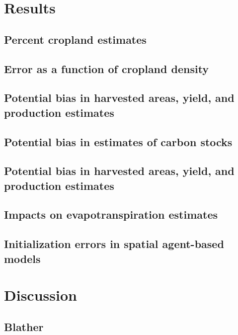 \documentclass{pnastwo}
\begin{document}
\begin{article}
\section{Results}

\subsection{Percent cropland estimates}

\subsection{Error as a function of cropland density}

\subsection{Potential bias in harvested areas, yield, and production estimates}

\subsection{Potential bias in estimates of carbon stocks}

\subsection{Potential bias in harvested areas, yield, and production estimates}

\subsection{Impacts on evapotranspiration estimates}

\subsection{Initialization errors in spatial agent-based models}


\section{Discussion}
\subsection{Blather}


\end{article}
\end{document}
